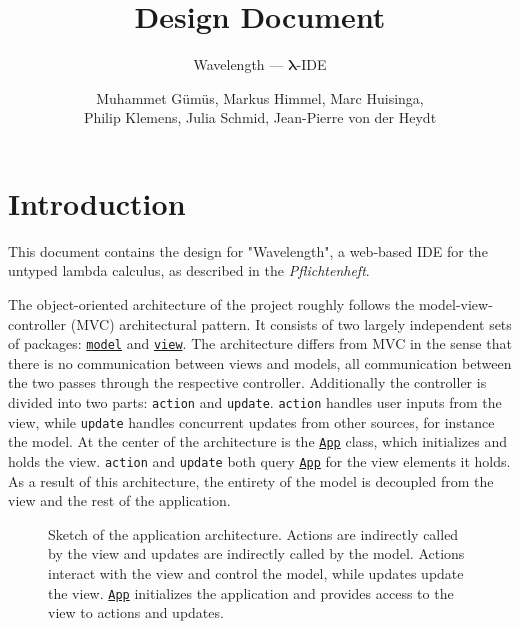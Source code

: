 \documentclass[a4paper, parskip=half]{scrartcl}
\title{Design Document}
\subtitle{Wavelength --- $\bm{\lambda}$-IDE}
\author{Muhammet Gümüs, Markus Himmel, Marc Huisinga,\\Philip Klemens, Julia Schmid, Jean-Pierre von der Heydt}
\newcommand{\pkglnk}[1]{\hyperref[pkg:edu.kit.wavelength.client.#1]{#1}}
\begin{document}
\maketitle
\thispagestyle{empty}
\newpage
\tableofcontents
\newpage
\section{Introduction}

This document contains the design for "Wavelength", a web-based IDE for the untyped
lambda calculus, as described in the \textit{Pflichtenheft}.

The object-oriented architecture of the project roughly follows the model-view-controller (MVC)
architectural pattern. It consists of two largely independent sets of packages: \texttt{\pkglnk{model}} and \texttt{\pkglnk{view}}.
The architecture differs from MVC in the sense that there is no communication between views and models, 
all communication between the two passes through the respective controller. 
Additionally the controller is divided into two parts: \texttt{action} and \texttt{update}. 
\texttt{action} handles user inputs from the view, while \texttt{update} handles concurrent updates from other sources, for instance the model.
At the center of the architecture is the \texttt{\hyperref[type:edu.kit.wavelength.client.view.App]{App}} class, which initializes and holds the view. 
\texttt{action} and \texttt{update} both query \texttt{\hyperref[type:edu.kit.wavelength.client.view.App]{App}} for the view elements it holds.
As a result of this architecture, the entirety of the model is decoupled from the view and the rest of the application.

\begin{figure}[h]
	\centering
	\caption{Sketch of the application architecture. Actions are indirectly called by the view
	and updates are indirectly called by the model. Actions interact with the view and control the model,
	while updates update the view. \texttt{\hyperref[type:edu.kit.wavelength.client.view.App]{App}} initializes 
	the application and provides access to the view to
		actions and updates.}
\end{figure}
\end{document}
